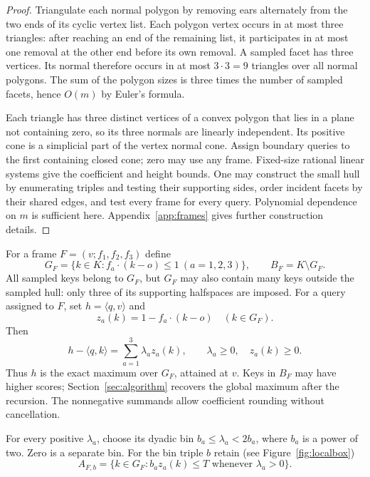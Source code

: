 \documentclass[notab,a4paper,UKenglish,numberwithinsect]{socg-lipics-v2021}
\newcommand{\ip}[2]{\langle #1,#2\rangle}
\begin{document}
\begin{proof}
Triangulate each normal polygon by removing ears alternately from the two ends of its cyclic vertex list. Each polygon vertex occurs in at most three triangles: after reaching an end of the remaining list, it participates in at most one removal at the other end before its own removal. A sampled facet has three vertices. Its normal therefore occurs in at most $3\cdot3=9$ triangles over all normal polygons. The sum of the polygon sizes is three times the number of sampled facets, hence $O(m)$ by Euler's formula.

Each triangle has three distinct vertices of a convex polygon that lies in a plane not containing zero, so its three normals are linearly independent. Its positive cone is a simplicial part of the vertex normal cone. Assign boundary queries to the first containing closed cone; zero may use any frame. Fixed-size rational linear systems give the coefficient and height bounds. One may construct the small hull by enumerating triples and testing their supporting sides, order incident facets by their shared edges, and test every frame for every query. Polynomial dependence on $m$ is sufficient here. Appendix~\ref{app:frames} gives further construction details.
\end{proof}

For a frame $F=(v;f_1,f_2,f_3)$ define
\begin{equation}\label{eq:goodbad}
 G_F=\{k\in K:f_a\cdot(k-o)\le1\ (a=1,2,3)\},\qquad B_F=K\setminus G_F.
\end{equation}
All sampled keys belong to $G_F$, but $G_F$ may also contain many keys outside the sampled hull: only three of its supporting halfspaces are imposed. For a query assigned to $F$, set $h=\ip qv$ and
\[
 z_a(k)=1-f_a\cdot(k-o)\quad(k\in G_F).
\]
Then
\begin{equation}\label{eq:nonnegative}
 h-\ip qk=\sum_{a=1}^3\lambda_a z_a(k),\qquad
 \lambda_a\ge0,\quad z_a(k)\ge0.
\end{equation}
Thus $h$ is the exact maximum over $G_F$, attained at $v$. Keys in $B_F$ may have higher scores; Section~\ref{sec:algorithm} recovers the global maximum after the recursion. The nonnegative summands allow coefficient rounding without cancellation.

For every positive $\lambda_a$, choose its dyadic bin
$b_a\le\lambda_a<2b_a$, where $b_a$ is a power of two. Zero is a separate bin. For the bin triple $b$ retain (see Figure~\ref{fig:localbox})
\begin{equation}\label{eq:localset}
A_{F,b}=\{k\in G_F:b_a z_a(k)\le T
                    \text{ whenever }\lambda_a>0\}.
\end{equation}
\end{document}
